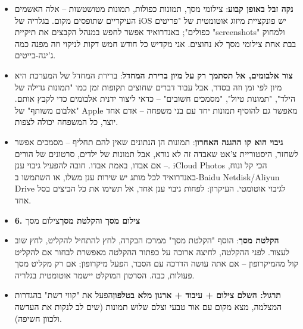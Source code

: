 \begin{itemize}
  \item \textbf{נקה זבל באופן קבוע}: צילומי מסך, תמונות כפולות, תמונות מטושטשות – אלה האשמים העיקריים שתופסים מקום. בגלריה של iOS יש פונקציית מיזוג אוטומטית של "פריטים כפולים"; באנדרואיד אפשר לחפש במנהל הקבצים את תיקיית "screenshots" ולמחוק בבת אחת צילומי מסך לא נחוצים. אני מקדיש כל חודש חמש דקות לניקוי וזה מפנה כמה ג'יגה-בייטים.
  \item \textbf{צור אלבומים, אל תסתמך רק על מיון ברירת המחדל}: ברירת המחדל של המערכת היא מיון לפי זמן וזה בסדר, אבל עבור דברים שחוצים תקופות זמן כמו "תמונות גדילה של הילד", "תמונות טיול", "מסמכים חשובים" – כדאי ליצור ידנית אלבומים כדי לקבץ אותם. "אלבום משותף" של Apple מאפשר גם להוסיף תמונות יחד עם בני משפחה – אדם אחד יוצר, כל המשפחה יכולה לצפות.
  \item \textbf{גיבוי הוא קו ההגנה האחרון}: תמונות הן הנתונים שאין להם תחליף – מסמכים אפשר לשחזר, היסטוריית צ'אט שאבדה זה לא נורא, אבל תמונות של ילדים, סרטונים של הורים – אם אבדו, באמת אבדו. חובה להפעיל גיבוי ענן. iCloud Photos הכי קל ונוח, באנדרואיד לכל מותג יש שירות ענן משלו, או השתמשו ב-Baidu Netdisk/Aliyun Drive לגיבוי אוטומטי. העיקרון: לפחות גיבוי ענן אחד, אל תשימו את כל הביצים בסל אחד.
  \item \textbf{6. צילום מסך והקלטת מסך}צילום מסך
\end{itemize}


\begin{itemize}
  \item \textbf{הקלטת מסך}: הוסף "הקלטת מסך" ממרכז הבקרה, לחץ להתחיל להקליט, לחץ שוב לעצור. לפני ההקלטה, לחיצה ארוכה על כפתור ההקלטה מאפשרת לבחור אם להקליט קול מהמיקרופון – אם אתה עושה הדרכה עם הסבר, הפעל מיקרופון; אם רק מקליט מסך פעולות, כבה. הסרטון המוקלט יישמר אוטומטית בגלריה.
  \item \textbf{תרגול: השלם צילום + עיבוד + ארגון מלא בטלפון}הפעל את "קווי רשת" בהגדרות המצלמה, מצא מקום עם אור טבעי וצלם שלוש תמונות (שים לב לנקות את העדשה ולכוון חשיפה).
\end{itemize}

